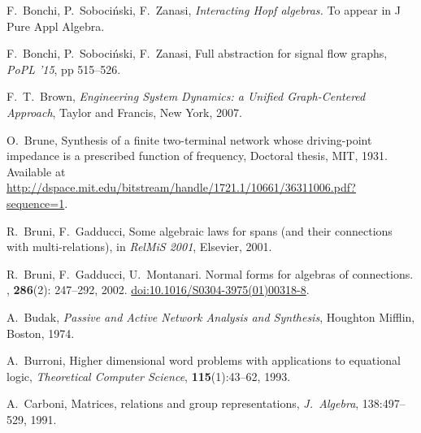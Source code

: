 \begin{thebibliography}{RSW00}
     F.\ Bonchi, P.\ Soboci\'nski, F.\ Zanasi, \emph{Interacting Hopf
    algebras.} To appear in J Pure Appl Algebra.

     F.\ Bonchi, P.\ Soboci\'nski, F.\ Zanasi, Full abstraction for
    signal flow graphs, \emph{PoPL '15}, pp 515--526.


     F.\ T.\ Brown, \textsl{Engineering System Dynamics: a 
    Unified Graph-Centered Approach}, Taylor and Francis, New York, 2007. 

     O.\ Brune, Synthesis of a finite two-terminal network whose
    driving-point impedance is a prescribed function of frequency, Doctoral
    thesis, MIT, 1931. Available at
    \href{http://dspace.mit.edu/bitstream/handle/1721.1/10661/36311006.pdf?sequence=1}
    {http://dspace.mit.edu/bitstream/handle/1721.1/10661/36311006.pdf?sequence=1}.

     R.\ Bruni, F.\ Gadducci, Some algebraic laws for spans (and their
    connections with multi-relations), in \textsl{RelMiS 2001}, Elsevier, 2001.

    R.\ Bruni, F.\ Gadducci, U.\ Montanari.
    \newblock Normal forms for algebras of connections.
    , {\bf 286}(2): 247--292, 2002. 
    \newblock \href{http://dx.doi.org/10.1016/S0304-3975(01)00318-8}{doi:10.1016/S0304-3975(01)00318-8}.

     A.\ Budak, {\sl Passive and Active Network Analysis and 
    Synthesis}, Houghton Mifflin, Boston, 1974.

     A.\ Burroni, Higher dimensional word problems with
    applications to equational logic, \textsl{Theoretical Computer Science},
    {\bf 115}(1):43--62, 1993.



     A.\ Carboni, Matrices, relations and group
    representations, {\sl J.\ Algebra}, 138:497--529, 1991.


\end{thebibliography}
